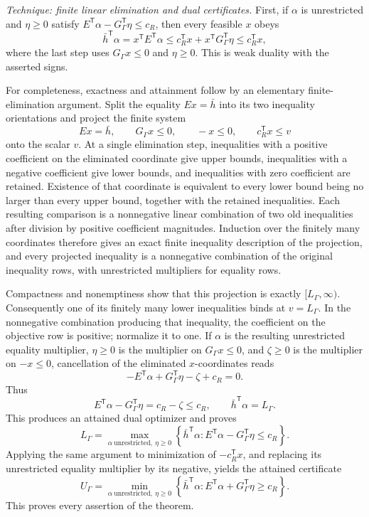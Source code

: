 \emph{Technique: finite linear elimination and dual certificates.}
First, if \(\alpha\) is unrestricted and \(\eta\geq0\) satisfy
\(E^{\mathsf T}\alpha-G_{\Gamma}^{\mathsf T}\eta\leq c_R\), then every feasible \(x\) obeys
\[
\bar h^{\mathsf T}\alpha
=x^{\mathsf T}E^{\mathsf T}\alpha
\leq c_R^{\mathsf T}x+x^{\mathsf T}G_{\Gamma}^{\mathsf T}\eta
\leq c_R^{\mathsf T}x,
\]
where the last step uses \(G_{\Gamma}x\leq0\) and \(\eta\geq0\).  This is weak duality with the asserted signs.

For completeness, exactness and attainment follow by an elementary finite-elimination argument.  Split the equality \(Ex=\bar h\) into its two inequality orientations and project the finite system
\[
Ex=\bar h,
\qquad G_{\Gamma}x\leq0,
\qquad -x\leq0,
\qquad c_R^{\mathsf T}x\leq v
\]
onto the scalar \(v\).  At a single elimination step, inequalities with a positive coefficient on the eliminated coordinate give upper bounds, inequalities with a negative coefficient give lower bounds, and inequalities with zero coefficient are retained.  Existence of that coordinate is equivalent to every lower bound being no larger than every upper bound, together with the retained inequalities.  Each resulting comparison is a nonnegative linear combination of two old inequalities after division by positive coefficient magnitudes.  Induction over the finitely many coordinates therefore gives an exact finite inequality description of the projection, and every projected inequality is a nonnegative combination of the original inequality rows, with unrestricted multipliers for equality rows.

Compactness and nonemptiness show that this projection is exactly \([L_{\Gamma},\infty)\).  Consequently one of its finitely many lower inequalities binds at \(v=L_{\Gamma}\).  In the nonnegative combination producing that inequality, the coefficient on the objective row is positive; normalize it to one.  If \(\alpha\) is the resulting unrestricted equality multiplier, \(\eta\geq0\) is the multiplier on \(G_{\Gamma}x\leq0\), and \(\zeta\geq0\) is the multiplier on \(-x\leq0\), cancellation of the eliminated \(x\)-coordinates reads
\[
-E^{\mathsf T}\alpha+G_{\Gamma}^{\mathsf T}\eta-\zeta+c_R=0.
\]
Thus
\[
E^{\mathsf T}\alpha-G_{\Gamma}^{\mathsf T}\eta
=c_R-\zeta\leq c_R,
\qquad
\bar h^{\mathsf T}\alpha=L_{\Gamma}.
\]
This produces an attained dual optimizer and proves
\[
L_{\Gamma}
=\max_{\alpha\ \mathrm{unrestricted},\ \eta\geq0}
\left\{\bar h^{\mathsf T}\alpha:
E^{\mathsf T}\alpha-G_{\Gamma}^{\mathsf T}\eta\leq c_R\right\}.
\]
Applying the same argument to minimization of \(-c_R^{\mathsf T}x\), and replacing its unrestricted equality multiplier by its negative, yields the attained certificate
\[
U_{\Gamma}
=\min_{\alpha\ \mathrm{unrestricted},\ \eta\geq0}
\left\{\bar h^{\mathsf T}\alpha:
E^{\mathsf T}\alpha+G_{\Gamma}^{\mathsf T}\eta\geq c_R\right\}.
\]
This proves every assertion of the theorem.

